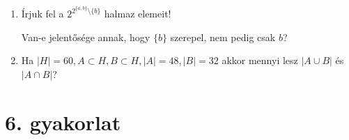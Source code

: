 \documentclass[a4paper]{article}
\begin{document}
\begin{enumerate}
\item

Írjuk fel a $2^{2^{\{a, b\}} \setminus \{b\}}$ halmaz elemeit!

\medskip

Van-e jelentősége annak, hogy $\{b\}$ szerepel, nem pedig csak $b$?

\item

Ha $|H| = 60, A \subset H, B \subset H, |A| = 48, |B| = 32$ akkor mennyi lesz $|A \cup B|$ és $|A \cap B|$?

\end{enumerate}

\section*{6. gyakorlat}
\end{document}

